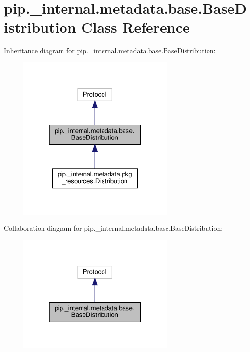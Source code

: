 \hypertarget{classpip_1_1__internal_1_1metadata_1_1base_1_1BaseDistribution}{}\section{pip.\+\_\+internal.\+metadata.\+base.\+Base\+Distribution Class Reference}
\label{classpip_1_1__internal_1_1metadata_1_1base_1_1BaseDistribution}


Inheritance diagram for pip.\+\_\+internal.\+metadata.\+base.\+Base\+Distribution\+:
\nopagebreak
\begin{figure}[H]
\begin{center}
\leavevmode
\includegraphics[width=220pt]{classpip_1_1__internal_1_1metadata_1_1base_1_1BaseDistribution__inherit__graph}
\end{center}
\end{figure}


Collaboration diagram for pip.\+\_\+internal.\+metadata.\+base.\+Base\+Distribution\+:
\nopagebreak
\begin{figure}[H]
\begin{center}
\leavevmode
\includegraphics[width=220pt]{classpip_1_1__internal_1_1metadata_1_1base_1_1BaseDistribution__coll__graph}
\end{center}
\end{figure}
